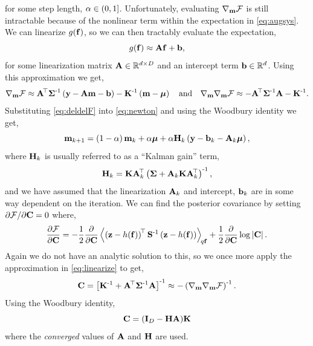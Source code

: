 \documentclass{article} %
\begin{document}
for some step length, $\step \in (0, 1]$. Unfortunately, evaluating
$\nabla_\pomean\Fengy$ is still intractable because of the nonlinear term
within the expectation in \eqref{eq:augsys}. We can linearize
$\nonlin{\lstate}$, so we can then tractably evaluate the expectation,
\begin{equation}
    \nonlin{\lstate} \approx \Linmat\lstate + \intcpt,
    \label{eq:linearize}
\end{equation}
for some linearization matrix $\Linmat \in \real{d \times D}$ and an intercept
term $\intcpt \in \real{d}$. Using this approximation we get,
\begin{equation}
    \nabla_\pomean \Fengy
        \approx \Linmat\transpose\lcov\inv\brac{\obs - \Linmat\pomean 
            - \intcpt} - \prcov\inv\brac{\pomean - \prmean}
    \quad \text{and} \quad
    \nabla_\pomean \nabla_\pomean \Fengy
        \approx - \Linmat\transpose\lcov\inv\Linmat - \prcov\inv.
        \label{eq:deldelF}
\end{equation}
Substituting \eqref{eq:deldelF} into \eqref{eq:newton} and using the Woodbury
identity we get,
\begin{equation}
    \pomean_{k+1} = \brac{1-\step}\pomean_k + \step\prmean 
        + \step\Kgain_k\brac{\obs - \intcpt_k - \Linmat_k\prmean},
    \label{eq:pomean}
\end{equation}
where $\Kgain_k$ is usually referred to as  a ``Kalman gain'' term,
\begin{equation}
    \Kgain_k = \prcov\Linmat_k\transpose\brac{\lcov +
        \Linmat_k\prcov\Linmat_k\transpose}\inv,
    \label{eq:kgain}
\end{equation}
and we have assumed that the linearization $\Linmat_k$ and intercept,
$\intcpt_k$ are in some way dependent on the iteration. We can find the 
posterior covariance by setting $\partial\Fengy/\partial\pocov = 0$ where,
\begin{equation}
    \frac{\partial\Fengy}{\partial\pocov} = -\frac{1}{2} 
        \frac{\partial}{\partial\pocov}
        \expec{q\lstate}{
            \brac{\augobs - \augnonlin{\lstate}}\transpose\augcov\inv
            \brac{\augobs - \augnonlin{\lstate}}
    } 
    + \frac{1}{2} \frac{\partial}{\partial\pocov} \log \deter{\pocov}.
\end{equation}
Again we do not have an analytic solution to this, so we once more apply the 
approximation in \eqref{eq:linearize} to get,
\begin{equation}
    \pocov = \sbrac{\prcov\inv + \Linmat\transpose\lcov\inv\Linmat}\inv
        \approx - \brac{\nabla_\pomean \nabla_\pomean \Fengy}\inv.
    \label{eq:pocovi}
\end{equation}
Using the Woodbury identity,
\begin{equation}
    \pocov = \brac{\ident{D} - \Kgain\Linmat}\!\prcov
    \label{eq:pocov}
\end{equation}
where the \emph{converged} values of $\Linmat$ and $\Kgain$ are used.
\end{document}
